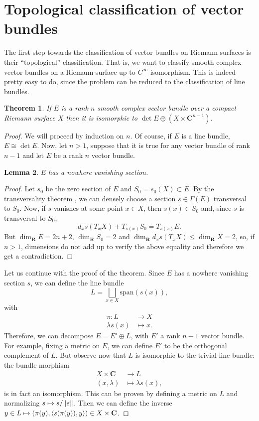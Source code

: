 \documentclass[12pt,a4paper]{book}
\newtheorem{thm}{Theorem}[section]
\newtheorem{lema}[thm]{Lemma}
\theoremstyle{definition} \newtheorem{defn}[thm]{Definition}
\theoremstyle{definition} \newtheorem{ejemplo}[thm]{Example}
\theoremstyle{remark} \newtheorem{rem}[thm]{Remark}
\def\CC{\mathbf{C}}
\def\RR{\mathbf{R}}
\def\Span{\mathrm{span}}
\DeclarePairedDelimiter\esc{\langle}{\rangle}
\DeclarePairedDelimiter\norm{\lVert}{\rVert}
\begin{document}
\section{Topological classification of vector bundles}
The first step towards the classification of vector bundles on Riemann surfaces is their ``topological'' classification. That is, we want to classify smooth complex vector bundles on a Riemann surface up to $C^\infty$ isomorphism. This is indeed pretty easy to do, since the problem can be reduced to the classification of line bundles.
\begin{thm}
  If $E$ is a rank $n$ smooth complex vector bundle over a compact Riemann surface $X$ then it is isomorphic to $\det E \oplus (X\times \CC^{n-1})$.
\end{thm}
\begin{proof}
   We will proceed by induction on $n$. Of course, if $E$ is a line bundle, $E\cong \det E$. Now, let $n>1$, suppose that it is true for any vector bundle of rank $n-1$ and let $E$ be a rank $n$ vector bundle.
   \begin{lema}
     $E$ has a nowhere vanishing section.
   \end{lema}
   \begin{proof}
     Let $s_0$ be the zero section of $E$ and $S_0=s_0(X)\subset E$. By the transversality theorem \cite{hirsch}, we can densely choose a section $s\in \Gamma(E)$ transversal to $S_0$. Now, if $s$ vanishes at some point $x\in X$, then $s(x)\in S_0$ and, since $s$ is transversal to $S_0$, $$d_xs(T_xX) + T_{s(x)}S_0 = T_{s(x)}E.$$ But $\dim_\RR E=2n+2$, $\dim_\RR S_0 = 2$ and $\dim_\RR d_xs(T_xX) \leq \dim_\RR X = 2$, so, if $n>1$, dimensions do not add up to verify the above equality and therefore we get a contradiction. 
   \end{proof}

   Let us continue with the proof of the theorem. Since $E$ has a nowhere vanishing section $s$, we can define the line bundle
   \begin{equation*}
     L=\bigsqcup_{x\in X} \Span(s(x)),
   \end{equation*}
   with 
   \begin{align*}
      \pi:L&\longrightarrow X\\ 
       \lambda s(x) &\longmapsto x.
     \end{align*}
     Therefore, we can decompose $E=E'\oplus L$, with $E'$ a rank $n-1$ vector bundle. For example, fixing a metric on $E$, we can define $E'$ to be the orthogonal complement of $L$. But observe now that $L$ is isomorphic to the trivial line bundle: the bundle morphism
     \begin{align*}
      X\times \CC  &\longrightarrow L\\ 
	 (x,\lambda) &\longmapsto \lambda s(x), 
       \end{align*}
       is in fact an isomorphism. This can be proven by defining a metric on $L$ and normalizing $s \mapsto s/\norm{s}$. Then we can define the inverse
     $ y\in L \mapsto (\pi(y), \esc{s(\pi(y)),y})\in X\times \CC$. 


\end{proof}
\end{document}
